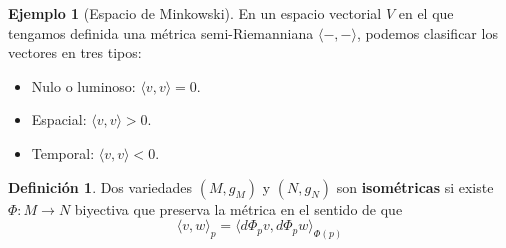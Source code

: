 \documentclass[spanish]{book}
\theoremstyle{definition}
\newtheorem*{defn}{Definición}
\newtheorem*{ejem}{Ejemplo}
\begin{document}
	\begin{ejem}[Espacio de Minkowski]
		En un espacio vectorial $V$ en el que tengamos definida una métrica semi-Riemanniana $\langle -,-\rangle$, podemos clasificar los vectores en tres tipos:
		\begin{itemize}
			\item Nulo o luminoso: $\langle v,v\rangle=0$.
			\item Espacial: $\langle v,v\rangle>0$.
			\item Temporal: $\langle v,v\rangle<0$.
		\end{itemize}
	\end{ejem}
	
	\begin{defn}
		Dos variedades $(M,g_M)$ y $(N,g_N)$ son \textbf{isométricas} si existe $\Phi:M\to N$ biyectiva que preserva la métrica en el sentido de que
		\[\langle v,w\rangle_p=\langle d\Phi_pv,d\Phi_pw\rangle_{\Phi(p)}\]
	\end{defn}
	
\end{document}
